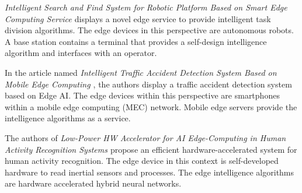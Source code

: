 
\textit{Intelligent Search and Find System for Robotic Platform Based on Smart Edge Computing Service \cite{barnawi2020intelligent}} displays a novel edge service to provide intelligent task division algorithms. The edge devices in this perspective are autonomous robots. A base station contains a terminal that provides a self-design intelligence algorithm and interfaces with an operator. 



In the article named \textit{Intelligent Traffic Accident Detection System Based on Mobile Edge Computing \cite{liao2017intelligent}}, the authors display a traffic accident detection system based on Edge AI. The edge devices within this perspective are smartphones within a mobile edge computing (MEC) network. Mobile edge servers provide the intelligence algorithms as a service.



The authors of \textit{Low-Power HW Accelerator for AI Edge-Computing in Human Activity Recognition Systems \cite{de2020low}} propose an efficient hardware-accelerated system for human activity recognition. The edge device in this context is self-developed hardware to read inertial sensors and processes. The edge intelligence algorithms are hardware accelerated hybrid neural networks.


